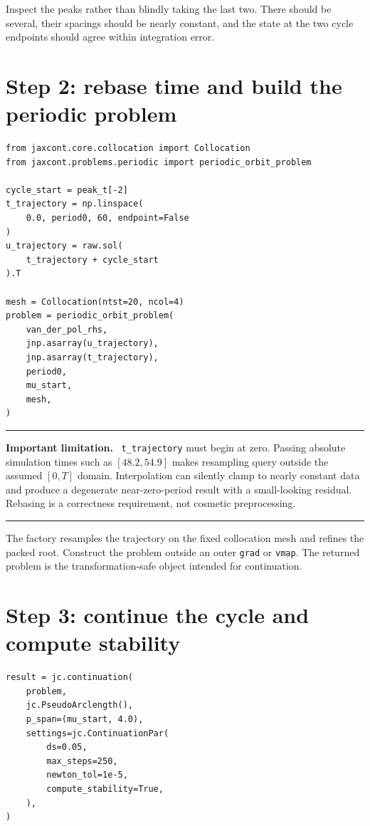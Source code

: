 \documentclass[11pt,oneside]{book}
\newenvironment{warningbox}
  {\par\medskip\noindent\begin{minipage}{\textwidth}
   \color{JaxRed}\rule{\textwidth}{0.8pt}\par
   \textbf{Important limitation.}\ \color{black}}
  {\par\color{JaxRed}\rule{\textwidth}{0.8pt}
   \end{minipage}\par\medskip}
\begin{document}
Inspect the peaks rather than blindly taking the last two. There should be
several, their spacings should be nearly constant, and the state at the two
cycle endpoints should agree within integration error.

\section{Step 2: rebase time and build the periodic problem}

\begin{lstlisting}
from jaxcont.core.collocation import Collocation
from jaxcont.problems.periodic import periodic_orbit_problem

cycle_start = peak_t[-2]
t_trajectory = np.linspace(
    0.0, period0, 60, endpoint=False
)
u_trajectory = raw.sol(
    t_trajectory + cycle_start
).T

mesh = Collocation(ntst=20, ncol=4)
problem = periodic_orbit_problem(
    van_der_pol_rhs,
    jnp.asarray(u_trajectory),
    jnp.asarray(t_trajectory),
    period0,
    mu_start,
    mesh,
)
\end{lstlisting}

\begin{warningbox}
\texttt{t\_trajectory} must begin at zero. Passing absolute simulation times
such as $[48.2,54.9]$ makes resampling query outside the assumed
$[0,T]$ domain. Interpolation can silently clamp to nearly constant data and
produce a degenerate near-zero-period result with a small-looking residual.
Rebasing is a correctness requirement, not cosmetic preprocessing.
\end{warningbox}

The factory resamples the trajectory on the fixed collocation mesh and refines
the packed root. Construct the problem outside an outer \texttt{grad} or
\texttt{vmap}. The returned problem is the transformation-safe object intended
for continuation.

\section{Step 3: continue the cycle and compute stability}

\begin{lstlisting}
result = jc.continuation(
    problem,
    jc.PseudoArclength(),
    p_span=(mu_start, 4.0),
    settings=jc.ContinuationPar(
        ds=0.05,
        max_steps=250,
        newton_tol=1e-5,
        compute_stability=True,
    ),
)
\end{lstlisting}
\end{document}

